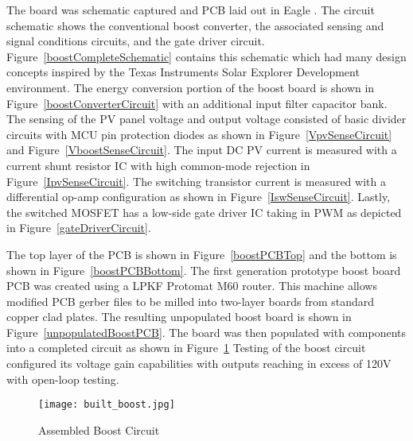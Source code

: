 The board was schematic captured and PCB laid out in Eagle . The circuit schematic shows the conventional boost converter, the associated sensing and signal conditions circuits, and the gate driver circuit. Figure~\ref{boostCompleteSchematic} contains this schematic which had many design concepts inspired by the Texas Instruments Solar Explorer Development environment.\cite{tiAppReportControl} The energy conversion portion of the boost board is shown in Figure~\ref{boostConverterCircuit} with an additional input filter capacitor bank. The sensing of the PV panel voltage and output voltage consisted of basic divider circuits with MCU pin protection diodes as shown in Figure~\ref{VpvSenseCircuit} and Figure~\ref{VboostSenseCircuit}. The input DC PV current is measured with a current shunt resistor IC with high common-mode rejection in Figure~\ref{IpvSenseCircuit}. The switching transistor current is measured with a differential op-amp configuration as shown in Figure~\ref{IswSenseCircuit}. Lastly, the switched MOSFET has a low-side gate driver IC taking in PWM as depicted in Figure~\ref{gateDriverCircuit}. 


The top layer of the PCB is shown in Figure~\ref{boostPCBTop} and the bottom is shown in Figure~\ref{boostPCBBottom}. The first generation prototype boost board PCB was created using a LPKF Protomat M60 router. This machine allows modified PCB gerber files to be milled into two-layer boards from standard copper clad plates. The resulting unpopulated boost board is shown in Figure~\ref{unpopulatedBoostPCB}. The board was then populated with components into a completed circuit as shown in Figure~\ref{Built Boost} Testing of the boost circuit configured its voltage gain capabilities with outputs reaching in excess of 120V with open-loop testing.

\begin{figure}
\centering
\texttt{[image: built\_boost.jpg]}
\caption{Assembled Boost Circuit}
\label{Built Boost}
\end{figure}


